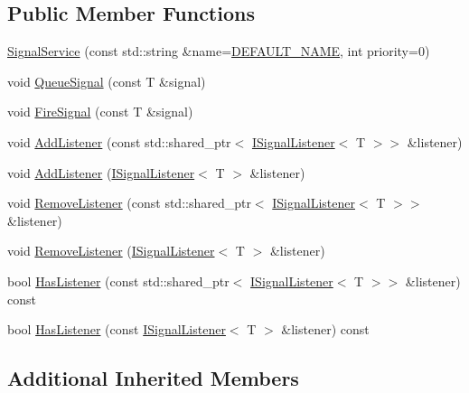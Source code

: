 \subsection*{Public Member Functions}
\begin{DoxyCompactItemize}
\item 
\hyperlink{classastu_1_1SignalService_acf4e3bfbacc9eb6654a84d59b3ff1a6a}{Signal\+Service} (const std\+::string \&name=\hyperlink{classastu_1_1Service_a8bb66bb984aa9490026232b193896634}{D\+E\+F\+A\+U\+L\+T\+\_\+\+N\+A\+ME}, int priority=0)
\item 
void \hyperlink{classastu_1_1SignalService_aa028a039b066a779af3834ffb3bdaa18}{Queue\+Signal} (const T \&signal)
\item 
void \hyperlink{classastu_1_1SignalService_a3ead09955e8e76bbdd6d9e5a853e88af}{Fire\+Signal} (const T \&signal)
\item 
void \hyperlink{classastu_1_1SignalService_a9027644028616eb9bad00447648cae29}{Add\+Listener} (const std\+::shared\+\_\+ptr$<$ \hyperlink{classastu_1_1ISignalListener}{I\+Signal\+Listener}$<$ T $>$$>$ \&listener)
\item 
void \hyperlink{classastu_1_1SignalService_aaee80c5636b808d9af77b98d23aceccd}{Add\+Listener} (\hyperlink{classastu_1_1ISignalListener}{I\+Signal\+Listener}$<$ T $>$ \&listener)
\item 
void \hyperlink{classastu_1_1SignalService_aea0777f0393a7f3c4dafff9d58934194}{Remove\+Listener} (const std\+::shared\+\_\+ptr$<$ \hyperlink{classastu_1_1ISignalListener}{I\+Signal\+Listener}$<$ T $>$$>$ \&listener)
\item 
void \hyperlink{classastu_1_1SignalService_a06fb3a74d8131e1d105d2006db7f8d64}{Remove\+Listener} (\hyperlink{classastu_1_1ISignalListener}{I\+Signal\+Listener}$<$ T $>$ \&listener)
\item 
bool \hyperlink{classastu_1_1SignalService_acc4935715afef10b89fd905e714be389}{Has\+Listener} (const std\+::shared\+\_\+ptr$<$ \hyperlink{classastu_1_1ISignalListener}{I\+Signal\+Listener}$<$ T $>$$>$ \&listener) const
\item 
bool \hyperlink{classastu_1_1SignalService_aa1d411924b4e71ed3501215d5b6ffb7e}{Has\+Listener} (const \hyperlink{classastu_1_1ISignalListener}{I\+Signal\+Listener}$<$ T $>$ \&listener) const
\end{DoxyCompactItemize}
\subsection*{Additional Inherited Members}


